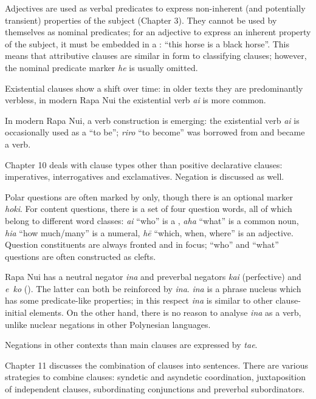 Adjectives are used as verbal predicates to express non-inherent (and potentially transient) properties of the subject (Chapter 3). They cannot be used by themselves as nominal predicates; for an adjective to express an inherent property of the subject, it must be embedded in a : “this horse is a black horse”. This means that attributive clauses are similar in form to classifying clauses; however, the nominal predicate marker \textit{he} is usually omitted.

Existential clauses show a shift over time: in older texts they are predominantly verbless, in modern Rapa Nui the existential verb \textit{ai} is more common. 

In modern Rapa Nui, a  verb construction is emerging: the existential verb \textit{ai} is occasionally used as a  “to be”; \textit{riro} “to become” was borrowed from  and became a  verb.

\medskip Chapter 10 deals with clause types other than positive declarative clauses: imperatives, interrogatives and exclamatives. Negation is discussed as well. 

Polar questions are often marked by  only, though there is an optional marker \textit{hoki}. For content questions, there is a set of four question words, all of which belong to different word classes: \textit{ai} “who” is a , \textit{aha} “what” is a common noun, \textit{hia} “how much/many” is a numeral, \textit{hē} “which, when, where” is an adjective. Question constituents are always fronted and in focus; “who” and “what” questions are often constructed as clefts.

Rapa Nui has a neutral negator \textit{{\ꞌ}ina} and preverbal negators \textit{kai} (perfective) and \textit{e~ko} (). The latter can both be reinforced by \textit{{\ꞌ}ina}. \textit{{\ꞌ}ina} is a phrase nucleus which has some predicate-like properties; in this respect \textit{{\ꞌ}ina} is similar to other clause-initial elements. On the other hand, there is no reason to analyse \textit{{\ꞌ}ina} as a verb, unlike nuclear negations in other Polynesian languages.

Negations in other contexts than main clauses are expressed by \textit{ta{\ꞌ}e}.

\medskip Chapter 11 discusses the combination of clauses into sentences. There are various strategies to combine clauses: syndetic and asyndetic coordination, juxtaposition of independent clauses, subordinating conjunctions and preverbal subordinators. 

